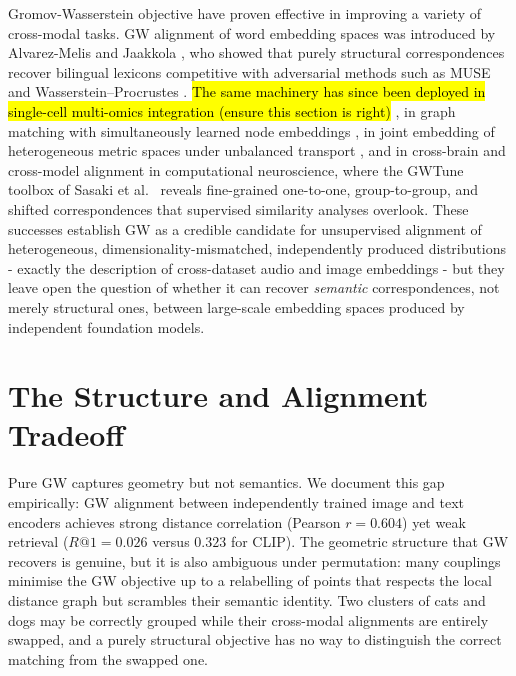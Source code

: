 Gromov-Wasserstein objective have proven effective in improving a variety of cross-modal tasks.
GW alignment of word embedding spaces was introduced by Alvarez-Melis and Jaakkola \cite{alvarez2018gromov}, who showed that purely structural correspondences recover bilingual lexicons competitive with adversarial methods such as MUSE \cite{conneau2018word} and Wasserstein--Procrustes \cite{grave2019unsupervised}. \hl{The same machinery has since been deployed in single-cell multi-omics integration (ensure this section is right)} \cite{demetci2022gromov}, in graph matching with simultaneously learned node embeddings \cite{xu2019gromov}, in joint embedding of heterogeneous metric spaces under unbalanced transport \cite{beier2025joint}, and in cross-brain and cross-model alignment in computational neuroscience, where the GWTune toolbox of Sasaki et al.\ \cite{sasaki2025gwtune} reveals fine-grained one-to-one, group-to-group, and shifted correspondences that supervised similarity analyses overlook. These successes establish GW as a credible candidate for unsupervised alignment of heterogeneous, dimensionality-mismatched, independently produced distributions - exactly the description of cross-dataset audio and image embeddings - but they leave open the question of whether it can recover \emph{semantic} correspondences, not merely structural ones, between large-scale embedding spaces produced by independent foundation models.

\section{The Structure and Alignment Tradeoff}

Pure GW captures geometry but not semantics. We document this gap empirically: GW alignment between independently trained image and text encoders achieves strong distance correlation (Pearson $r = 0.604$) yet weak retrieval ($R@1 = 0.026$ versus $0.323$ for CLIP). The geometric structure that GW recovers is genuine, but it is also ambiguous under permutation: many couplings minimise the GW objective up to a relabelling of points that respects the local distance graph but scrambles their semantic identity. Two clusters of cats and dogs may be correctly grouped while their cross-modal alignments are entirely swapped, and a purely structural objective has no way to distinguish the correct matching from the swapped one.

